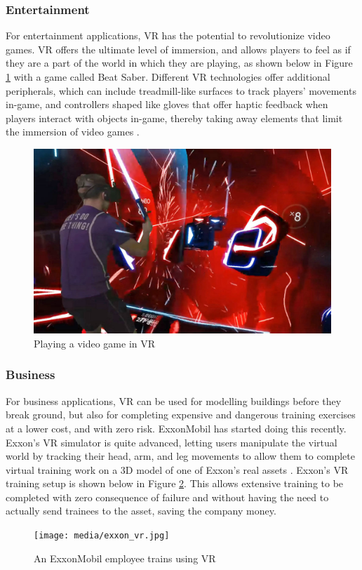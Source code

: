 \subsubsection{Entertainment}
For entertainment applications, VR has the potential to revolutionize video games.
VR offers the ultimate level of immersion, and allows players to feel as if they
are a part of the world in which they are playing, as shown below in Figure \ref{vr:saber}
with a game called Beat Saber.
Different VR technologies offer additional peripherals, which can include treadmill-like
surfaces to track players' movements in-game, and controllers
shaped like gloves that offer haptic feedback when players interact with objects in-game,
thereby taking away elements that limit the immersion of video games \cite{vr_peripherals}.

\begin{figure}[h]
    \centering
    \includegraphics[width=.5\linewidth]{media/beatsaber_vr.jpg}
    \caption{Playing a video game in VR \cite{beatsaber_cite}}
    \label{vr:saber}
\end{figure}

\subsubsection{Business}
For business applications, VR can be used for modelling buildings before they break
ground, but also for completing expensive and dangerous training exercises at a lower
cost, and with zero risk. ExxonMobil has started doing this recently.
Exxon's VR simulator is quite advanced, letting users manipulate the 
virtual world by tracking their head, arm, and leg movements to allow them to 
complete virtual training work on a 3D model of one of Exxon's real assets \cite{exxon_vr}.
Exxon's VR training setup is shown below in Figure \ref{vr:exxon}.
This allows extensive training to be completed with zero consequence of failure and
without having the need to actually send trainees to the asset, saving the company money.

\begin{figure}[h]
    \centering
    \texttt{[image: media/exxon\_vr.jpg]}
    \caption{An ExxonMobil employee trains using VR \cite{exxon_vr}}
    \label{vr:exxon}
\end{figure}

